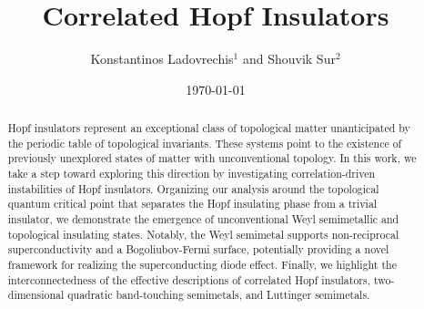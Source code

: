 \documentclass[reprint,floatfix, twocolumn]{revtex4-1}
\begin{document}
 

	

\title{Correlated Hopf Insulators}


\author{Konstantinos Ladovrechis$^1$ and Shouvik Sur$^2$}


\begin{abstract}
Hopf insulators represent an exceptional class of topological matter unanticipated by the periodic table of topological invariants. 
These systems point to the existence of previously unexplored states of matter with unconventional topology. 
In this work, we take a step toward exploring this direction by investigating correlation-driven instabilities of Hopf insulators. 
Organizing our analysis around the topological quantum critical point that separates the Hopf insulating phase from a trivial insulator, we demonstrate the emergence of unconventional Weyl semimetallic and topological insulating states. 
Notably, the Weyl semimetal supports non-reciprocal superconductivity and a Bogoliubov-Fermi surface, potentially providing a novel framework for realizing the superconducting diode effect. 
Finally, we highlight the interconnectedness of the effective descriptions of correlated Hopf insulators, two-dimensional quadratic band-touching semimetals, and Luttinger semimetals.
\end{abstract}

\date{\today}

\maketitle
\end{document}
